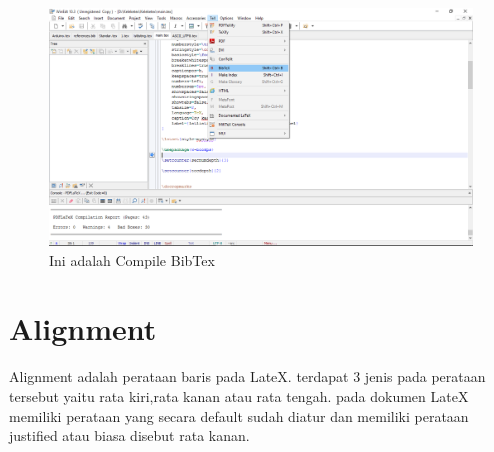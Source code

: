 \begin{enumerate}
\begin{figure}[!htbp]
\end{figure}
   \begin{figure}[!htbp]
  \centering
  \includegraphics[width=.75\textwidth]{figures/bibtexx.png}
  \caption{Ini adalah Compile BibTex}\label{fig:bibtexx}
\end{figure}
\end{enumerate}

\section{Alignment}
Alignment adalah perataan baris pada LateX. terdapat 3 jenis pada perataan tersebut yaitu rata kiri,rata kanan atau rata tengah. pada dokumen LateX memiliki perataan yang secara default sudah diatur dan memiliki perataan justified atau biasa disebut rata kanan.

